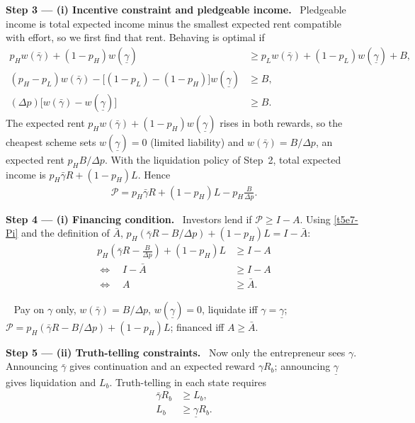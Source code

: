 \documentclass[11pt,a4paper]{article}
\newcommand{\step}[2]{\par\medskip\noindent\textbf{Step #1 --- #2.}~}
\newcommand{\answer}[1]{\par\smallskip\noindent\fbox{\textbf{Answer #1.}}~}
\begin{document}
\step{3}{(i) Incentive constraint and pledgeable income} Pledgeable income is total expected income
minus the smallest expected rent compatible with effort, so we first find that rent. Behaving is optimal if
\begin{align}
  p_Hw(\bar\gamma)+(1-p_H)w(\underline\gamma) &\geq p_Lw(\bar\gamma)+(1-p_L)w(\underline\gamma)+B, \nonumber\\
  (p_H-p_L)w(\bar\gamma)-\bigl[(1-p_L)-(1-p_H)\bigr]w(\underline\gamma) &\geq B, \nonumber\\
  (\Delta p)\bigl[w(\bar\gamma)-w(\underline\gamma)\bigr] &\geq B. \label{t5e7-ICi}
\end{align}
The expected rent $p_Hw(\bar\gamma)+(1-p_H)w(\underline\gamma)$ rises in both rewards, so the cheapest
scheme sets $w(\underline\gamma)=0$ (limited liability) and $w(\bar\gamma)=B/\Delta p$, an expected rent
$p_HB/\Delta p$. With the liquidation policy of Step~2, total expected income is
$p_H\bar\gamma R+(1-p_H)L$. Hence
\begin{align}
  \mathcal P = p_H\bar\gamma R+(1-p_H)L-p_H\frac{B}{\Delta p}. \label{t5e7-Pi}
\end{align}

\step{4}{(i) Financing condition} Investors lend if $\mathcal P\geq I-A$. Using \eqref{t5e7-Pi} and the
definition of $\bar A$, $p_H(\bar\gamma R-B/\Delta p)+(1-p_H)L=I-\bar A$:
\begin{align}
  p_H\left(\bar\gamma R-\frac{B}{\Delta p}\right)+(1-p_H)L &\geq I-A \nonumber\\
  \Longleftrightarrow\quad I-\bar A &\geq I-A \nonumber\\
  \Longleftrightarrow\quad A&\geq\bar A. \label{t5e7-Abar}
\end{align}

\answer{(i)} Pay on $\gamma$ only, $w(\bar\gamma)=B/\Delta p$, $w(\underline\gamma)=0$, liquidate iff
$\gamma=\underline\gamma$; $\mathcal P=p_H(\bar\gamma R-B/\Delta p)+(1-p_H)L$; financed iff $A\ge\bar A$.

\step{5}{(ii) Truth-telling constraints} Now only the entrepreneur sees $\gamma$. Announcing
$\bar\gamma$ gives continuation and an expected reward $\gamma R_b$; announcing $\underline\gamma$ gives
liquidation and $L_b$. Truth-telling in each state requires
\begin{align}
  \bar\gamma R_b &\geq L_b, \label{t5e7-TTg}\\
  L_b &\geq \underline\gamma R_b. \label{t5e7-TTb}
\end{align}
\end{document}

